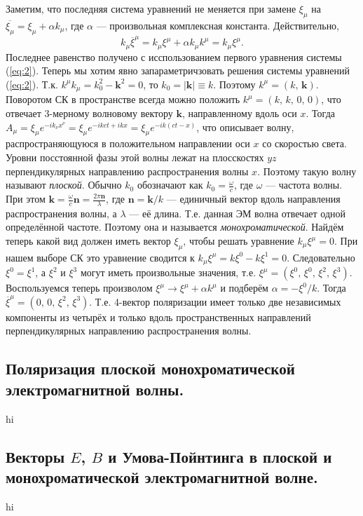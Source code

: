 \documentclass[a4paper,12pt]{article}
\begin{document}
  Заметим, что последняя система уравнений не меняется при замене
  $\xi_ \mu$ на $\overline{\xi_\mu}=\xi_\mu+\alpha k_\mu$, где $\alpha$ ---
  произвольная комплексная константа. Действительно,
  \[
  k_\mu \overline{\xi}^\mu=k_\mu \xi^\mu + \alpha k_\mu k^\mu=k_\mu \xi^\mu
  .\] 
  Последнее равенство получено с исспользованием первого уравнения системы 
  (\ref{eq:2}).
  Теперь мы хотим явно запараметричзовать решения системы уравнений (\ref{eq:2}).
  Т.\:к. $k^\mu k_\mu=k_0^2-\mathbf{k}^2=0$, то $k_0= |\mathbf{k}|\equiv k$.
  Поэтому $k^\mu=(k,\,\mathbf{k})$. Поворотом СК в пространстве всегда можно
  положить $k^\mu=(k,\,k,\,0,\,0)$, что отвечает 3-мерному волновому вектору
  $\mathbf{k}$, направленному вдоль оси $x$. Тогда $A_\mu=\xi_\mu e ^{-i k_\nu x^\nu}=
  \xi_\mu e ^{-ikct+ikx}=\xi_\mu e ^{-ik(ct-x)}$, что  описывает волну,
  распространяющуюся в положительном направлении оси $x$ со скоростью света.
  Уровни посстоянной фазы этой волны лежат на плосскостях 
  $yz$ перпендикулярных направлению распространения волны $x$. Поэтому такую
  волну называют \emph{плоской}. Обычно $k_0$ обозначают как $k_0= \frac{\omega}{c}$,
  где  $\omega$ --- частота волны. При этом $\mathbf{k}=\frac{\omega}{c}
  \mathbf{n}=\frac{2\pi\mathbf{n}}{\lambda}$, где $\mathbf{n}=\mathbf{k} /k$ ---
  единичный вектор вдоль направления распространения волны, а $\lambda$ ---
  её длина. Т.\:е. данная ЭМ волна отвечает одной определённой частоте.
  Поэтому она и называется \emph{монохроматической}.
  Найдём теперь какой вид должен иметь вектор $\xi_\mu$, чтобы решать уравнение
  $k_\mu \xi^\mu=0$. При нашем выборе СК это уравнение сводится к $k_\mu \xi^\mu
  =k\xi^0-k\xi^1=0$. Следовательно $\xi^0=\xi^1$, а  $\xi^2$ и $\xi^3$ могут
  иметь произвольные значения, т.\:е. $\xi^\mu=(\xi^0,\,\xi^0,\,\xi^2,\,\xi^3)$.
  Воспользуемся теперь произволом  $\xi^\mu \to \xi^\mu +\alpha k^\mu$ и
  подберём $\alpha=-\xi^0 /k$. Тогда $\overline{\xi}^\mu=(0,\,0,\,\xi^2,\,\xi^3)$.
  Т.\:е. 4-вектор поляризации имеет только две независимых компоненты из 
  четырёх и только вдоль пространственных направлений перпендикулярных
  направлению распространения волны.
\subsection{Поляризация плоской монохроматической электромагнитной волны.}
hi
\subsection{Векторы $E$, $B$ и Умова-Пойнтинга в плоской и монохроматической
электромагнитной волне.}
hi
\end{document}
